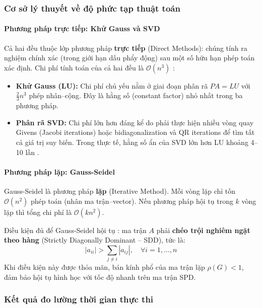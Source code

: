 \subsubsection{Cơ sở lý thuyết về độ phức tạp thuật toán}

\paragraph{Phương pháp trực tiếp: Khử Gauss và SVD}

Cả hai đều thuộc lớp phương pháp \textbf{trực tiếp} (Direct Methods): chúng tính ra nghiệm chính xác (trong giới hạn dấu phẩy động) sau một số hữu hạn phép toán xác định. Chi phí tính toán của cả hai đều là $\mathcal{O}(n^3)$ \cite{golub, trefethen}:

\begin{itemize}
    \item \textbf{Khử Gauss (LU):} Chi phí chủ yếu nằm ở giai đoạn phân rã $PA = LU$ với $\frac{2}{3}n^3$ phép nhân--cộng. Đây là hằng số (constant factor) nhỏ nhất trong ba phương pháp.
    \item \textbf{Phân rã SVD:} Chi phí lớn hơn đáng kể do phải thực hiện nhiều vòng quay Givens (Jacobi iterations) hoặc bidiagonalization và QR iterations để tìm tất cả giá trị suy biến. Trong thực tế, hằng số ẩn của SVD lớn hơn LU khoảng 4--10 lần \cite{golub}.
\end{itemize}

\paragraph{Phương pháp lặp: Gauss-Seidel}

Gauss-Seidel là phương pháp \textbf{lặp} (Iterative Method). Mỗi vòng lặp chỉ tốn $\mathcal{O}(n^2)$ phép toán (nhân ma trận--vector). Nếu phương pháp hội tụ trong $k$ vòng lặp thì tổng chi phí là $\mathcal{O}(kn^2)$.

Điều kiện đủ để Gauss-Seidel hội tụ \cite{strang}: ma trận $A$ phải \textbf{chéo trội nghiêm ngặt theo hàng} (Strictly Diagonally Dominant -- SDD), tức là:
\begin{equation}
    |a_{ii}| > \sum_{j \neq i} |a_{ij}|, \quad \forall i = 1, \ldots, n
\end{equation}
Khi điều kiện này được thỏa mãn, bán kính phổ của ma trận lặp $\rho(G) < 1$, đảm bảo hội tụ hình học với tốc độ nhanh trên ma trận SPD.

\subsubsection{Kết quả đo lường thời gian thực thi}

